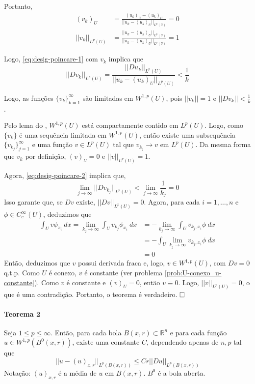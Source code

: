 \documentclass[a4paper, 11pt]{book}
\newcommand{\qed}{$\hfill\square$}
\begin{document}
Portanto, \begin{align*}
	(v_k)_U &= \frac{(u_k)_U - (u_k)_U}{||u_k - (u_k)_U||_{L^p(U)}} = 0 \\
	||v_k||_{L^p(U)} &= \frac{||u_k - (u_k)_U||_{L^p(U)}}{||u_k - (u_k)_U||_{L^p(U)}} = 1
\end{align*}

Logo, \eqref{eq:desig-poincare-1} com $v_k$ implica que \begin{equation}\label{eq:desig-poincare-2}
	|| Dv_k||_{L^p(U)} = \frac{||Du_k||_{L^p(U)}}{||u_k - (u_k)_U||_{L^p(U)}} < \frac{1}{k}
\end{equation}

Logo, as funções $\{v_k\}_{k=1}^\infty$ são limitadas em $W^{1,p}(U)$, pois $||v_k||=1$ e $||Dv_k||<\frac{1}{k}$. 

Pelo lema do , $W^{1,p}(U)$ está compactamente contido em $L^p(U)$. Logo, como $\{v_k\}$ é uma sequência limitada em $W^{1,p}(U)$, então existe uma subsequência $\{v_{k_j}\}_{j=1}^\infty$ e uma função $v \in L^p(U)$ tal que $v_{k_j}\rightarrow v \text{ em } L^p(U)$. Da mesma forma que $v_k$ por definição, $(v)_U=0$ e $||v||_{L^p(U)}=1$.

Agora, \eqref{eq:desig-poincare-2} implica que, \begin{equation*}
	\lim_{j\rightarrow\infty} ||Dv_{k_j}||_{L^p(U)} < \lim_{j\rightarrow\infty} \frac{1}{k_j} = 0
\end{equation*} Isso garante que, se $Dv$ existe, $||Dv||_{L^p(U)}=0$. Agora, para cada $i=1,\ldots,n$ e $\phi \in C^\infty_c(U)$, deduzimos que \begin{align*}
\int_U v \phi_{x_i}\ dx = \lim_{k_j \rightarrow \infty} \int_U v_{k_j} \phi_{x_i}\ dx &= - \lim_{k_j \rightarrow \infty } \int_U v_{k_j,x_i} \phi \ dx \\ 
&=  -  \int_U \lim_{k_j \rightarrow \infty } v_{k_j,x_i} \phi \ dx \\
&= 0 \end{align*} 
Então, deduzimos que $v$ possui derivada fraca e, logo, $v \in W^{1,p}(U)$, com $Dv=0$ q.t.p. Como $U$ é conexo, $v$ é constante (ver problema \ref{prob:U-conexo_u-constante}). Como $v$ é constante e $(v)_U=0$, então $v \equiv 0$. Logo, $||v||_{L^p(U)}=0$, o que é uma contradição. Portanto, o teorema é verdadeiro. \qed



\paragraph{Teorema 2}\label{t:sobolev-poincare-2}
Seja \(1\leq p \leq \infty\). Então, para cada bola \(B(x,r)\subset \mathbb{R}^n\) e para cada função \(u \in W^{1,p}(B^0(x,r))\), existe uma constante \(C\), dependendo apenas de \(n,p\) tal que \[||u - (u)_{x,r}||_{L^p(B(x,r))} \leq Cr ||Du||_{L^p(B(x,r))}\]
Notação: \((u)_{x,r}\) é a média de \(u\) em \(B(x,r)\). \(B^0\) é a bola aberta.
\end{document}
